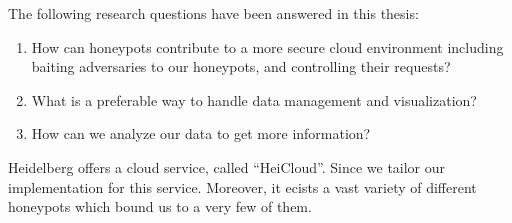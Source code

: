 

The following research questions have been answered in this thesis:

\begin{enumerate}
    \item How can honeypots contribute to a more secure cloud environment including baiting adversaries to our honeypots, and controlling their requests?
    \item What is a preferable way to handle data management and visualization?
    \item How can we analyze our data to get more information?
\end{enumerate}


Heidelberg offers a cloud service, called \enquote{HeiCloud}.
Since  we tailor our implementation for this service.
Moreover, it ecists a vast variety of different honeypots which bound us to a very few of them. 
